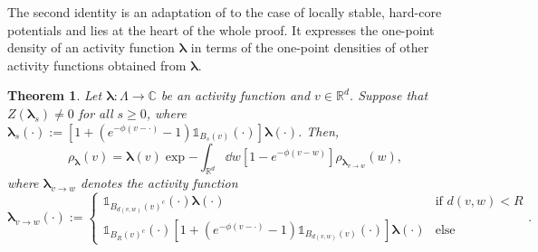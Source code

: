 \documentclass[11pt]{article}
\newcommand{\R}{\mathbb R}
\newcommand{\C}{\mathbb C}
\newcommand{\bl}{\bm{\lambda}}
\newcommand{\hcconst}{R}
\newcommand{\indicator}[1]{\mathds{1}_{#1}}
\numberwithin{equation}{section}
\theoremstyle{plain}
\newtheorem{theorem}{Theorem}[section]
\theoremstyle{definition}
\theoremstyle{remark}
\begin{document}
The second identity is an adaptation of \cite[Theorem 8]{michelen2023analyticity} to the case of locally stable, hard-core potentials and lies at the heart of the whole proof.
It expresses the one-point density of an activity function $\bl$ in terms of the one-point densities of other activity functions obtained from $\bl$.

\begin{theorem}
\label{thm:recursion}
Let $\bl:\Lambda\rightarrow\C$ be an activity function and $v\in\R^{d}$.
Suppose that $Z(\bl_{s})\ne 0$ for all $s\ge 0$, where $\bl_{s}(\cdot):=\left[1+(e^{-\phi(v-\cdot)}-1)\indicator{B_{s}(v)}(\cdot)\right]\bl(\cdot)$.
Then, 
\begin{equation}
\label{eqn:one-point-densities_recursion}
\rho_{\bl}(v)=\bl(v)\exp{-\int_{\R^{d}}\dd{w}\left[1-e^{-\phi(v-w)}\right]\rho_{\bl_{v\rightarrow w}}(w)},
\end{equation}
where $\bl_{v\rightarrow w}$ denotes the activity function
\begin{equation}
\label{eqn:one-point-densities_modulation}
\bl_{v\rightarrow w}(\cdot):=
\begin{cases}
\indicator{B_{d(v,w)}(v)^{c}}(\cdot)\bl(\cdot) & \text{if }d(v,w)<\hcconst \\
\indicator{B_{\hcconst}(v)^{c}}(\cdot)\left[1+(e^{-\phi(v-\cdot)}-1)\indicator{B_{d(v,w)}(v)}(\cdot)\right]\bl(\cdot) & \text{else}
\end{cases}.
\end{equation}
\end{theorem}
\end{document}
